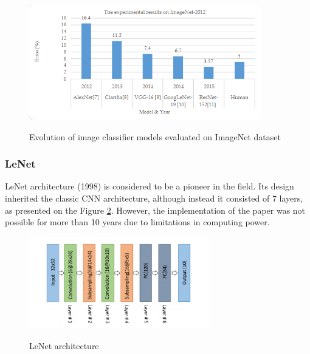 \documentclass[english, 12pt, a4paper, elec, utf8, a-1b, online]{aaltothesis}
\begin{document}
\begin{figure}[htb]
	\begin{center}
		\includegraphics[height=5cm]{./image_net.png}
	\end{center}
	\caption{Evolution of image classifier models evaluated on ImageNet dataset \cite{alom01}}
	\begin{center}
		\label{image_net}
	\end{center}
\end{figure}
\FloatBarrier

\subsubsection{LeNet}
LeNet architecture (1998)\cite{lecun-gradientbased-learning-applied-1998} is considered to be a pioneer in the field. Its design inherited the classic CNN architecture, although instead it consisted of 7 layers, as presented on the Figure \ref{LeNet}. However, the implementation of the paper was not possible for more than 10 years due to limitations in computing power. 

\begin{figure}[htb]
	\begin{center}
		\includegraphics[height=4cm]{./LeNet.png}
	\end{center}
	\caption{LeNet architecture \cite{alom01}}
	\begin{center}
		\label{LeNet}
	\end{center}
\end{figure}
\FloatBarrier
\end{document}
